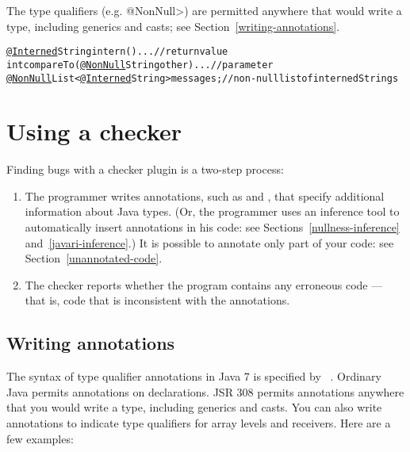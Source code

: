 \begin{enumerate}
The type qualifiers (e.g. \<@NonNull>) are permitted anywhere
that would write a type, including generics and casts; see
Section~\ref{writing-annotations}.

\begin{alltt}
  \underline{@Interned} String intern() \ttlcb{} ... \ttrcb{}             // return value
  int compareTo(\underline{@NonNull} String other) \ttlcb{} ... \ttrcb{}  // parameter
  \underline{@NonNull} List<\underline{@Interned} String> messages;     // non-null list of interned Strings
\end{alltt}

\end{enumerate}


\htmlhr
\section{Using a checker\label{using-a-checker}}

Finding bugs with a checker plugin is a two-step process:

\begin{enumerate}

\item The programmer writes annotations, such as  and
  , that specify additional information about Java types.
  (Or, the programmer uses an inference tool to automatically insert
  annotations in his code:  see Sections~\ref{nullness-inference} and~\ref{javari-inference}.)
  It is possible to annotate only part of your code:  see
  Section~\ref{unannotated-code}.

\item The checker reports whether the program contains any erroneous code
  --- that is, code that is inconsistent with the annotations.

\end{enumerate}





\subsection{Writing annotations\label{writing-annotations}}

The syntax of type qualifier annotations in Java 7 is specified by
~\cite{jsr308}.  Ordinary
Java permits annotations on declarations.  JSR 308 permits annotations
anywhere that you would write a type, including generics and casts.  You
can also write annotations to indicate type qualifiers for array levels and
receivers.  Here are a few examples:

